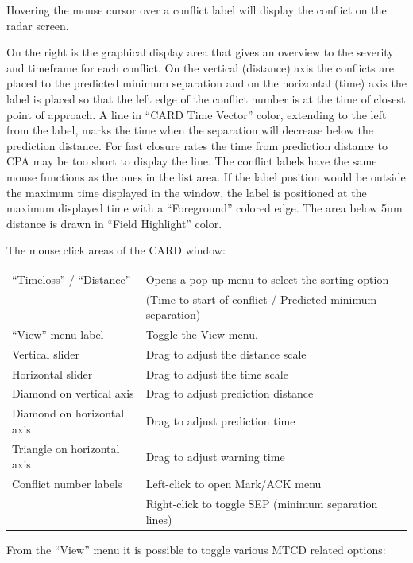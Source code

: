 \documentclass[11pt,a4paper,oldfontcommands]{memoir}
\begin{document}
Hovering the mouse cursor over a conflict label will display the conflict on the radar screen.

On the right is the graphical display area that gives an overview to the severity and timeframe for each conflict. On the vertical (distance) axis the conflicts are placed to the predicted minimum separation and on the horizontal (time) axis the label is placed so that the left edge of the conflict number is at the time of closest point of approach. A line in “CARD Time Vector” color, extending to the left from the label, marks the time when the separation will decrease below the prediction distance. For fast closure rates the time from prediction distance to CPA may be too short to display the line. The conflict labels have the same mouse functions as the ones in the list area. If the label position would be outside the maximum time displayed in the window, the label is positioned at the maximum displayed time with a “Foreground” colored edge.
The area below 5nm distance is drawn in “Field Highlight” color.

The mouse click areas of the CARD window:

\begin{tabular}{l l}
    “Timeloss” / “Distance”     & Opens a pop-up menu to select the sorting option\\
                                & (Time to start of conflict / Predicted minimum separation)\\
    “View” menu label           & Toggle the View menu.\\
    Vertical slider             & Drag to adjust the distance scale\\
    Horizontal slider           & Drag to adjust the time scale\\
    Diamond on vertical axis    & Drag to adjust prediction distance    \\
    Diamond on horizontal axis  & Drag to adjust prediction time\\
    Triangle on horizontal axis & Drag to adjust warning time\\
    Conflict number labels      & Left-click to open Mark/ACK menu\\
                                & Right-click to toggle SEP (minimum separation lines)\\
\end{tabular}

From the “View” menu it is possible to toggle various MTCD related options:
\end{document}
